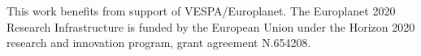 %

%




%

\acknowledgments
This work benefits from support of VESPA/Europlanet.
The Europlanet 2020 Research Infrastructure is funded by the European Union
under the Horizon 2020 research and innovation program, grant agreement N.654208.


%
%
%
%
%
%
%
%
%









